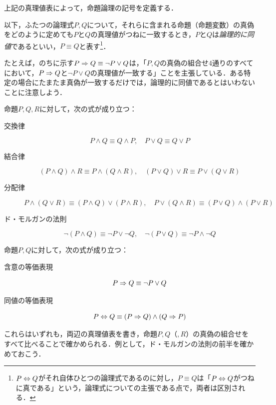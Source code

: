 上記の真理値表によって，命題論理の記号を定義する．

以下，ふたつの論理式$P,Q$について，それらに含まれる命題（命題変数）の真偽をどのように定めても$P$と$Q$の真理値がつねに一致するとき，$P$と$Q$は\emph{論理的に同値}であるといい，$P \equiv Q$と表す\footnote{$P \mathrel{\Leftrightarrow} Q$がそれ自体ひとつの論理式であるのに対し，$P \equiv Q$は「$P \mathrel{\Leftrightarrow} Q$がつねに真である」という，論理式についての主張である点で，両者は区別される．}．

たとえば，のちに示す$P \mathrel{\Rightarrow} Q \equiv \lnot P \lor Q$は，「$P,Q$の真偽の組合せ$4$通りのすべてにおいて，$P \mathrel{\Rightarrow} Q$と$\lnot P \lor Q$の真理値が一致する」ことを主張している．ある特定の場合にたまたま真偽が一致するだけでは，論理的に同値であるとはいわないことに注意しよう．

\begin{prop}{}{}
  命題$P,Q,R$に対して，次の式が成り立つ：
  \begin{description}
    \item[交換律]
          \[
            P \land Q \equiv Q \land P,\quad
            P \lor Q \equiv Q \lor P
          \]
    \item[結合律]
          \[
            (P \land Q) \land R \equiv P \land (Q \land R),\quad
            (P \lor Q) \lor R \equiv P \lor (Q \lor R)
          \]
    \item[分配律]
          \[
            P \land (Q \lor R) \equiv (P \land Q) \lor (P \land R),\quad
            P \lor (Q \land R) \equiv (P \lor Q) \land (P \lor R)
          \]
    \item[ド・モルガンの法則]
          \[
            \lnot (P \land Q) \equiv \lnot P \lor \lnot Q,\quad
            \lnot (P \lor Q) \equiv \lnot P \land \lnot Q
          \]
  \end{description}
\end{prop}

\begin{prop}{}{}
  命題$P,Q$に対して，次の式が成り立つ：
  \begin{description}
    \item[含意の等価表現] 
          \[
            P \mathrel{\Rightarrow} Q \equiv \lnot P \lor Q
          \]
    \item[同値の等価表現]
          \[
            P \mathrel{\Leftrightarrow} Q \equiv (P \mathrel{\Rightarrow} Q) \land (Q \mathrel{\Rightarrow} P)
          \]
  \end{description}
\end{prop}

これらはいずれも，両辺の真理値表を書き，命題$P,Q$（$,R$）の真偽の組合せをすべて比べることで確かめられる．例として，ド・モルガンの法則の前半を確かめておこう．

